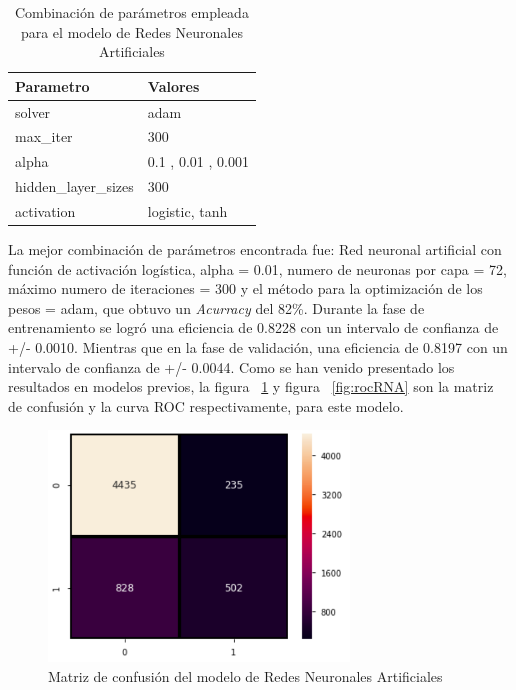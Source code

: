 \documentclass[conference]{IEEEtran}
\begin{document}
\begin{table}[H]
\centering
\begin{tabular}{|l|l|}
\hline
Parametro    & Valores              \\ \hline
solver & adam       \\ \hline
max\_iter    & 300   \\ \hline
alpha    &  0.1  , 0.01 , 0.001  \\ \hline
hidden\_layer\_sizes    & 300   \\ \hline
activation    & logistic, tanh   \\ \hline
\end{tabular}
\caption{Combinación de parámetros empleada para el modelo de Redes Neuronales Artificiales}
\label{tab:parametrosGNA}
\end{table}
La mejor combinación de parámetros encontrada fue: Red neuronal artificial con función de activación logística, alpha = 0.01, numero de neuronas por capa = 72, máximo numero de iteraciones = 300 y el método para la optimización de los pesos = adam, que obtuvo un \textit{Acurracy} del 82\%.
Durante la fase de entrenamiento se logró una eficiencia de 0.8228 con un intervalo de confianza de +/-  0.0010. Mientras que en la fase de validación, una eficiencia de 0.8197 con un intervalo de confianza de +/- 0.0044.
Como se han venido presentado los resultados en modelos previos, la figura ~\ref{fig:matrixGNA}  y figura ~\ref{fig:rocRNA} son la matriz de confusión y la curva ROC respectivamente, para este modelo.
\begin{center}
    \begin{figure}[h]
        \hfill
     \centerline{\includegraphics[width=8cm]{MatrixGNA.png}}
    \caption{Matriz de confusión del modelo de Redes Neuronales Artificiales}
    \label{fig:matrixGNA}
    \end{figure}  
\end{center}
\end{document}
